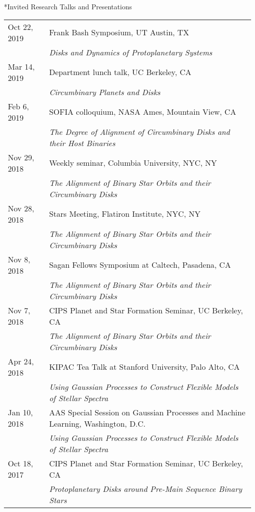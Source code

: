 \documentclass[10pt]{article}
\makeatletter
\newcommand{\rowskip}{1.2mm}
\renewcommand{\section}{\@startsection{section}{1}{0pt}{-\baselineskip}{0.5\baselineskip}{\scshape\color{myblue1}}}
\makeatother
\begin{document}
\section*{Invited Research Talks and Presentations}
\begin{tabular*}{\textwidth}{@{\hspace{10pt}}p{1.2in}l}
  Oct 22, 2019 & Frank Bash Symposium, UT Austin, TX \\
  & \emph{Disks and Dynamics of Protoplanetary Systems} \\[\rowskip]
  Mar 14, 2019 & Department lunch talk, UC Berkeley, CA \\
  & \emph{Circumbinary Planets and Disks} \\[\rowskip]
  Feb 6, 2019 & SOFIA colloquium, NASA Ames, Mountain View, CA \\
  & \emph{The Degree of Alignment of Circumbinary Disks and their Host Binaries} \\[\rowskip]
  Nov 29, 2018 & Weekly seminar, Columbia University, NYC, NY \\
  & \emph{The Alignment of Binary Star Orbits and their Circumbinary Disks} \\[\rowskip]
  Nov 28, 2018 & Stars Meeting, Flatiron Institute, NYC, NY \\
  & \emph{The Alignment of Binary Star Orbits and their Circumbinary Disks} \\[\rowskip]
  Nov 8, 2018 & Sagan Fellows Symposium at Caltech, Pasadena, CA \\
  & \emph{The Alignment of Binary Star Orbits and their Circumbinary Disks} \\[\rowskip]
  Nov 7, 2018 & CIPS Planet and Star Formation Seminar, UC Berkeley, CA  \\
  & \emph{The Alignment of Binary Star Orbits and their Circumbinary Disks} \\[\rowskip]
  Apr 24, 2018 & KIPAC Tea Talk at Stanford University, Palo Alto, CA \\
  & \emph{Using Gaussian Processes to Construct Flexible Models of Stellar Spectra} \\[\rowskip]
  Jan 10, 2018 & AAS Special Session on Gaussian Processes and Machine Learning, Washington, D.C. \\
  & \emph{Using Gaussian Processes to Construct Flexible Models of Stellar Spectra}\\[\rowskip]
  Oct 18, 2017 & CIPS Planet and Star Formation Seminar, UC Berkeley, CA \\
  & \emph{Protoplanetary Disks around Pre-Main Sequence Binary Stars} \\[\rowskip]

\end{tabular*}
\end{document}
